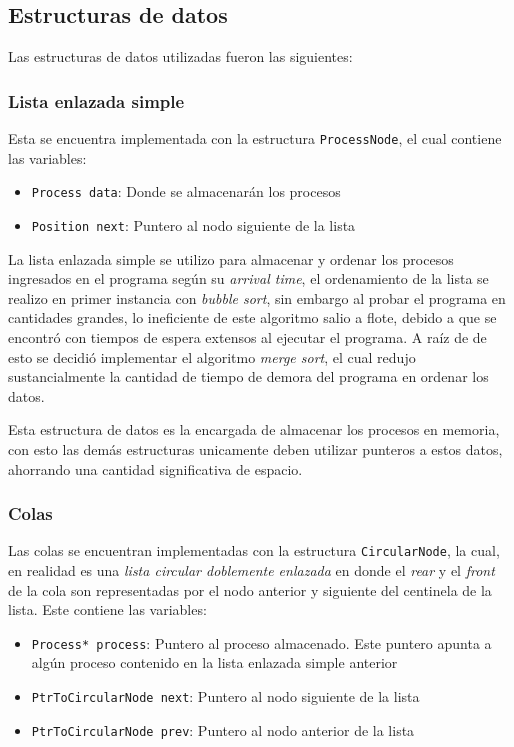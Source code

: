\subsection{Estructuras de datos}
Las estructuras de datos utilizadas fueron las siguientes:
\subsubsection*{Lista enlazada simple}
Esta se encuentra implementada con la estructura \texttt{ProcessNode}, el cual contiene las variables:
\begin{itemize}
    \item \texttt{Process data}: Donde se almacenarán los procesos
    \item \texttt{Position next}: Puntero al nodo siguiente de la lista
\end{itemize}
La lista enlazada simple se utilizo para almacenar y ordenar los procesos ingresados en el programa según su \textit{arrival time}, el ordenamiento de la lista se realizo en primer instancia con \textit{bubble sort}, sin embargo al probar el programa en cantidades grandes, lo ineficiente de este algoritmo salio a flote, debido a que se encontró con tiempos de espera extensos al ejecutar el programa. A raíz de de esto se decidió implementar el algoritmo \textit{merge sort}, el cual redujo sustancialmente la cantidad de tiempo de demora del programa en ordenar los datos.

Esta estructura de datos es la encargada de almacenar los procesos en memoria, con esto las demás estructuras unicamente deben utilizar punteros a estos datos, ahorrando una cantidad significativa de espacio.

\subsubsection*{Colas}
Las colas se encuentran implementadas con la estructura \texttt{CircularNode}, la cual, en realidad es una \textit{lista circular doblemente enlazada} en donde el \textit{rear} y el \textit{front} de la cola son representadas por el nodo anterior y siguiente del centinela de la lista. Este contiene las variables:
\begin{itemize}
    \item \texttt{Process* process}: Puntero al proceso almacenado. Este puntero apunta a algún proceso contenido en la lista enlazada simple anterior
    \item \texttt{PtrToCircularNode next}: Puntero al nodo siguiente de la lista
    \item \texttt{PtrToCircularNode prev}: Puntero al nodo anterior de la lista
\end{itemize}

